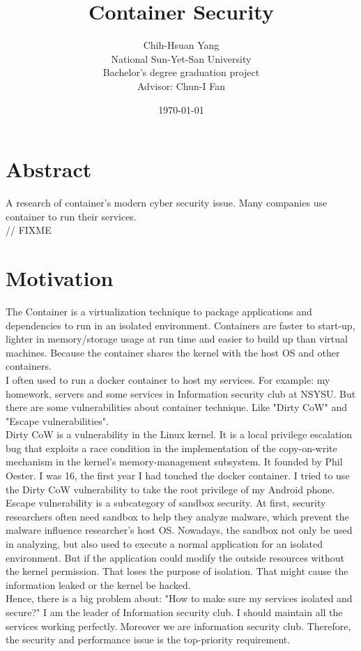 \documentclass[12pt,a4paper,oneside,draft]{article}
\title{{\mytitle Container Security}}
\author{Chih-Hsuan Yang\\
National Sun-Yet-San University \\
Bachelor's degree graduation project \\
Advisor: Chun-I Fan
}
\date{\today}
\begin{document}
\maketitle

\newpage
\tableofcontents
\newpage

\section{Abstract}
A research of container's modern cyber security issue.
Many companies use container to run their services.\\
// FIXME

\section{Motivation}
The Container is a virtualization technique to package applications and dependencies to run in
an isolated environment. Containers are faster to start-up, lighter in memory/storage usage
at run time and easier to build up than virtual machines. Because the container shares the
kernel with the host OS and other containers.\\
I often used to run a docker container to host my services. For example: my homework,
servers and some services in Information security club at NSYSU.
But there are some vulnerabilities about container technique. Like "Dirty CoW\cite{Dirty_CoW}"
and "Escape vulnerabilities".\\
Dirty CoW is a vulnerability in the Linux kernel. It is a local privilege escalation bug
that exploits a race condition in the implementation of the copy-on-write mechanism in the
kernel's memory-management subsystem\cite{Dirty_CoW_wiki}. It founded by Phil Oester. I
was 16, the first year I had touched the docker container. I tried to use the Dirty CoW
vulnerability to take the root privilege of my Android phone.\\
Escape vulnerability is a subcategory of sandbox security. At first, security researchers often
need sandbox to help they analyze malware, which prevent the malware influence researcher's
host OS. Nowadays, the sandbox not only be used in analyzing, but also used to execute a
normal application for an isolated environment. But if the application could modify the
outside resources without the kernel permission. That loses the purpose of isolation. That
might cause the information leaked or the kernel be hacked.\\
Hence, there is a big problem about: "How to make sure my services isolated and secure?" I
am the leader of Information security club. I should maintain all the services working
perfectly. Moreover we are information security club. Therefore, the security and performance
issue is the top-priority requirement.\\
\end{document}

